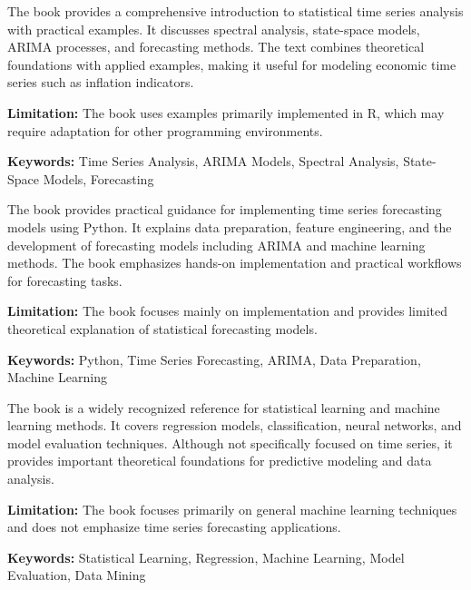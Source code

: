 
{
	The book \cite{Shumway2017} provides a comprehensive introduction to statistical time series analysis with practical examples. It discusses spectral analysis, state-space models, ARIMA processes, and forecasting methods. The text combines theoretical foundations with applied examples, making it useful for modeling economic time series such as inflation indicators.
	
	\bigskip
	
	\textbf{Limitation:} The book uses examples primarily implemented in R, which may require adaptation for other programming environments.
	
	\scriptsize{\textbf{Keywords:} Time Series Analysis, ARIMA Models, Spectral Analysis, State-Space Models, Forecasting}
}


{
	The book \cite{Brownlee2017} provides practical guidance for implementing time series forecasting models using Python. It explains data preparation, feature engineering, and the development of forecasting models including ARIMA and machine learning methods. The book emphasizes hands-on implementation and practical workflows for forecasting tasks.
	
	\bigskip
	
	\textbf{Limitation:} The book focuses mainly on implementation and provides limited theoretical explanation of statistical forecasting models.
	
	\scriptsize{\textbf{Keywords:} Python, Time Series Forecasting, ARIMA, Data Preparation, Machine Learning}
}


{
	The book \cite{Hastie2009} is a widely recognized reference for statistical learning and machine learning methods. It covers regression models, classification, neural networks, and model evaluation techniques. Although not specifically focused on time series, it provides important theoretical foundations for predictive modeling and data analysis.
	
	\bigskip
	
	\textbf{Limitation:} The book focuses primarily on general machine learning techniques and does not emphasize time series forecasting applications.
	
	\scriptsize{\textbf{Keywords:} Statistical Learning, Regression, Machine Learning, Model Evaluation, Data Mining}
}

